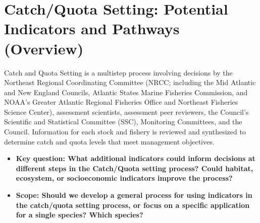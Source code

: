 \documentclass[
]{article}
\author{}
\date{\vspace{-2.5em}}
\providecommand{\tightlist}{%
  \setlength{\itemsep}{0pt}\setlength{\parskip}{0pt}}
\begin{document}
\vspace{-1cm}

\section{Catch/Quota Setting: Potential Indicators and Pathways
(Overview)}\label{catchquota-setting-potential-indicators-and-pathways-overview}

\begin{noteblock}
Catch and Quota Setting is a multistep process involving decisions by
the Northeast Regional Coordinating Committee (NRCC; including the Mid
Atlantic and New England Councils, Atlantic States Marine Fisheries
Commission, and NOAA's Greater Atlantic Regional Fisheries Office and
Northeast Fisheries Science Center), assessment scientists, assessment
peer reviewers, the Council's Scientific and Statistical Committee
(SSC), Monitoring Committees, and the Council. Information for each
stock and fishery is reviewed and synthesized to determine catch and
quota levels that meet management objectives.

\end{noteblock}

\begin{itemize}
\tightlist
\item
  \textbf{Key question: What additional indicators could inform
  decisions at different steps in the Catch/Quota setting process? Could
  habitat, ecosystem, or socioeconomic indicators improve the process?}
\item
  \textbf{Scope: Should we develop a general process for using
  indicators in the catch/quota setting process, or focus on a specific
  application for a single species? Which species?}
\end{itemize}
\end{document}
